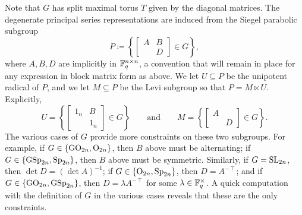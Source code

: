 Note that $G$ has split maximal torus $T$ given by the diagonal matrices. The degenerate principal series representations are induced from the Siegel parabolic subgroup
\[P\coloneqq\left\{\begin{bmatrix}
    A & B \\
      & D
\end{bmatrix}\in G\right\},\]
where $A,B,D$ are implicitly in $\mathbb F_q^{n\times n}$, a convention that will remain in place for any expression in block matrix form as above. We let $U\subseteq P$ be the unipotent radical of $P$, and we let $M\subseteq P$ be the Levi subgroup so that $P=M\ltimes U$. Explicitly,
\[U=\left\{\begin{bmatrix}
    1_n & B \\
      & 1_n
\end{bmatrix}\in G\right\}\qquad\text{and}\qquad M=\left\{\begin{bmatrix}
    A &   \\
      & D
\end{bmatrix}\in G\right\}.\]
The various cases of $G$ provide more constraints on these two subgroups. For example, if $G\in\{\mathrm{GO}_{2n},\mathrm{O}_{2n}\}$, then $B$ above must be alternating; if $G\in\{\mathrm{GSp}_{2n},\mathrm{Sp}_{2n}\}$, then $B$ above must be symmetric. Similarly, if $G=\mathrm{SL}_{2n}$, then $\det D=(\det A)^{-1}$; if $G\in\{\mathrm{O}_{2n},\mathrm{Sp}_{2n}\}$, then $D=A^{-\intercal}$; and if $G\in\{\mathrm{GO}_{2n},\mathrm{GSp}_{2n}\}$, then $D=\lambda A^{-\intercal}$ for some $\lambda\in\mathbb F_q^\times$. A quick computation with the definition of $G$ in the various cases reveals that these are the only constraints.

